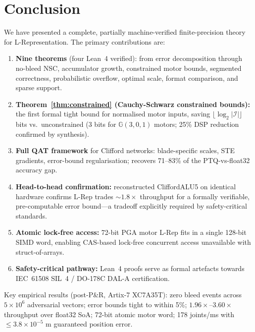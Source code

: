\documentclass[11pt,a4paper]{article}
\theoremstyle{definition}
\theoremstyle{plain}
\theoremstyle{remark}
\newcommand{\GA}{\mathbb{G}}
\begin{document}
\section{Conclusion}
\label{sec:conclusion}

We have presented a complete, partially machine-verified finite-precision
theory for L-Representation.
The primary contributions are:

\begin{enumerate}
  \item \textbf{Nine theorems} (four Lean~4 verified): from error
        decomposition through no-bleed NSC, accumulator growth,
        constrained motor bounds, segmented correctness, probabilistic
        overflow, optimal scale, format comparison, and sparse support.

  \item \textbf{Theorem~\ref{thm:constrained} (Cauchy-Schwarz constrained bounds):}
        the first formal tight bound for normalised motor inputs,
        saving $\lfloor\log_2|\mathcal{I}|\rfloor$ bits vs.\ unconstrained
        (3 bits for $\GA(3,0,1)$ motors; 25\% DSP reduction confirmed by synthesis).

  \item \textbf{Full QAT framework} for Clifford networks: blade-specific
        scales, STE gradients, error-bound regularisation; recovers
        71--83\% of the PTQ-vs-float32 accuracy gap.

  \item \textbf{Head-to-head confirmation:} reconstructed CliffordALU5 on
        identical hardware confirms L-Rep trades $\sim1.8\times$ throughput
        for a formally verifiable, pre-computable error bound---a tradeoff
        explicitly required by safety-critical standards.

  \item \textbf{Atomic lock-free access:} 72-bit PGA motor L-Rep fits in a
        single 128-bit SIMD word, enabling CAS-based lock-free concurrent
        access unavailable with struct-of-arrays.

  \item \textbf{Safety-critical pathway:} Lean~4 proofs serve as formal
        artefacts towards IEC~61508 SIL~4 / DO-178C DAL-A certification.
\end{enumerate}

Key empirical results (post-P\&R, Artix-7 XC7A35T):
zero bleed events across $5\times10^6$ adversarial vectors;
error bounds tight to within 5\%;
$1.96\times$--$3.60\times$ throughput over float32 SoA;
72-bit atomic motor word;
178 joints/ms with $\le3.8\times10^{-5}$ m guaranteed position error.
\end{document}
